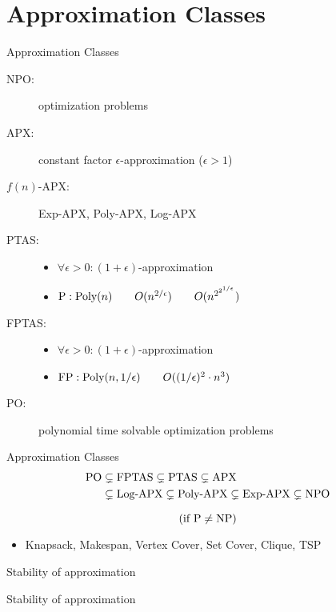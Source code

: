 \section{Approximation Classes}

\begin{frame}{Approximation Classes}
  \begin{description}
	\item[NPO:] \np{} optimization problems
	\item[APX:] constant factor $\epsilon$-approximation ($\epsilon > 1$)
	\item[$f(n)$-APX:] Exp-APX, Poly-APX, Log-APX
	\item[PTAS:] 
	  \begin{itemize}
		\item $\forall \epsilon > 0: (1 + \epsilon)$-approximation
		\item $\text{P}: \text{Poly}(n) \qquad O(n^{2/\epsilon}) \qquad O(n^{2^{2^{1/\epsilon}}})$
	  \end{itemize}
	\item[FPTAS:] 
	  \begin{itemize}
		\item $\forall \epsilon > 0: (1 + \epsilon)$-approximation
		\item $\text{FP}: \text{Poly}(n, 1/\epsilon) \qquad O((1/\epsilon)^2 \cdot n^3)$
	  \end{itemize}
	\item[PO:] polynomial time solvable optimization problems
  \end{description}
\end{frame}
\begin{frame}{Approximation Classes}
  \begin{align*}
	\text{PO} &\subsetneq \text{FPTAS} \subsetneq \text{PTAS} \subsetneq \text{APX} \\
	&\subsetneq \text{Log-APX} \subsetneq \text{Poly-APX} \subsetneq \text{Exp-APX} \subsetneq \text{NPO}
  \end{align*}

  \[
	(\text{if } \text{P}{} \neq \text{NP}{})
  \]

  \begin{itemize}
	\item Knapsack, Makespan, Vertex Cover, Set Cover, Clique, TSP
  \end{itemize}
\end{frame}
\begin{frame}{Stability of approximation}
\end{frame}
\begin{frame}{Stability of approximation}
\end{frame}
